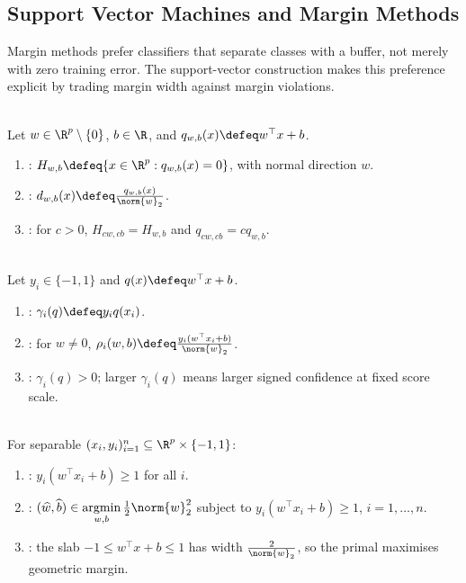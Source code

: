 \subsection{Support Vector Machines and Margin Methods}

Margin methods prefer classifiers that separate classes with a buffer, not merely with zero training error.  The support-vector construction makes this preference explicit by trading margin width against margin violations.

\begin{definition} \label{def:sl-affine-hyperplane-signed-distance} \\
Let $w\in\R^p\setminus\{0\}$, $b\in\R$, and $q_{w,b}(x)\defeq w^\top x+b$.
\begin{enumerate}[label=(\roman*)]
\setlength{\itemsep}{0pt}
\item {}: $H_{w,b}\defeq\{x\in\R^p:q_{w,b}(x)=0\}$, with normal direction $w$.
\item {}: $d_{w,b}(x)\defeq \frac{q_{w,b}(x)}{\norm{w}_2}$.
\item {}: for $c>0$, $H_{cw,cb}=H_{w,b}$ and $q_{cw,cb}=cq_{w,b}$.
\end{enumerate}
\end{definition}

\begin{definition} \label{def:sl-functional-margin} \\
Let $y_i\in\{-1,1\}$ and $q(x)\defeq w^\top x+b$.
\begin{enumerate}[label=(\roman*)]
\setlength{\itemsep}{0pt}
\item {}: $\gamma_i(q)\defeq y_iq(x_i)$.
\item {}: for $w\neq0$, $\rho_i(w,b)\defeq \frac{y_i(w^\top x_i+b)}{\norm{w}_2}$.
\item {}: $\gamma_i(q)>0$; larger $\gamma_i(q)$ means larger signed confidence at fixed score scale.
\end{enumerate}
\end{definition}

\begin{definition} \label{def:sl-hard-margin-svm} \\
For separable $(x_i,y_i)_{i=1}^n\subseteq\R^p\times\{-1,1\}$:
\begin{enumerate}[label=(\roman*)]
\setlength{\itemsep}{0pt}
\item {}: $y_i(w^\top x_i+b)\geq1$ for all $i$.
\item {}: $(\widehat{w},\widehat{b})\in\operatorname*{argmin}\limits_{w,b}\frac12\norm{w}_2^2$ subject to $y_i(w^\top x_i+b)\geq1$, $i=1,\ldots,n$.
\item {}: the slab $-1\leq w^\top x+b\leq1$ has width $\frac{2}{\norm{w}_2}$, so the primal maximises geometric margin.
\end{enumerate}
\end{definition}

